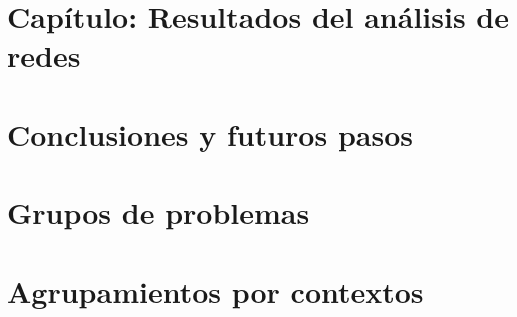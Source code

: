 \documentclass[11pt,a4paper,twoside]{tesis}
\begin{document}
\chapter{Capítulo: Resultados del análisis de redes}


\chapter{Conclusiones y futuros pasos}





\clearpage
\appendix
\chapter{Grupos de problemas}

\chapter{Agrupamientos por contextos}


\backmatter


\end{document}
